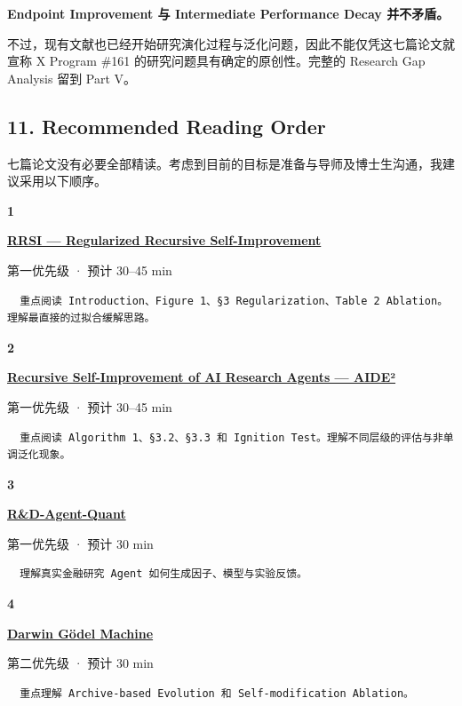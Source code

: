 \textbf{Endpoint Improvement 与 Intermediate Performance Decay 并不矛盾。}

不过，现有文献也已经开始研究演化过程与泛化问题，因此不能仅凭这七篇论文就宣称 X Program \#161 的研究问题具有确定的原创性。完整的 Research Gap Analysis 留到 Part V。

\hypertarget{part-3-44-0001-recommended-reading-order}{%
\subsection{11. Recommended Reading Order}\label{part-3-44-0001-recommended-reading-order}}

七篇论文没有必要全部精读。考虑到目前的目标是准备与导师及博士生沟通，我建议采用以下顺序。

\textbf{1}

\textbf{\href{https://arxiv.org/abs/2609.24972}{RRSI --- Regularized Recursive Self-Improvement}}

第一优先级 · 预计 30--45 min

\begin{verbatim}
  重点阅读 Introduction、Figure 1、§3 Regularization、Table 2 Ablation。理解最直接的过拟合缓解思路。
\end{verbatim}

\textbf{2}

\textbf{\href{https://arxiv.org/abs/2609.26457}{Recursive Self-Improvement of AI Research Agents --- AIDE²}}

第一优先级 · 预计 30--45 min

\begin{verbatim}
  重点阅读 Algorithm 1、§3.2、§3.3 和 Ignition Test。理解不同层级的评估与非单调泛化现象。
\end{verbatim}

\textbf{3}

\textbf{\href{https://arxiv.org/abs/2505.15155}{R\&D-Agent-Quant}}

第一优先级 · 预计 30 min

\begin{verbatim}
  理解真实金融研究 Agent 如何生成因子、模型与实验反馈。
\end{verbatim}

\textbf{4}

\textbf{\href{https://arxiv.org/abs/2505.22954}{Darwin Gödel Machine}}

第二优先级 · 预计 30 min

\begin{verbatim}
  重点理解 Archive-based Evolution 和 Self-modification Ablation。
\end{verbatim}

